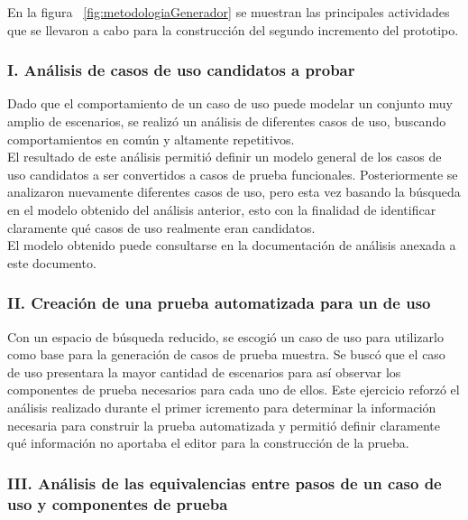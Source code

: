 	En la figura ~\ref{fig:metodologiaGenerador} se muestran las principales actividades que se llevaron a cabo para la construcción del segundo incremento del prototipo.
	
	
\subsubsection{I. Análisis de casos de uso candidatos a probar}

	Dado que el comportamiento de un caso de uso puede modelar un conjunto muy amplio de escenarios, se realizó un análisis de diferentes casos de uso, buscando comportamientos en común y altamente repetitivos.\\
	
	El resultado de este análisis permitió definir un modelo general de los casos de uso candidatos a ser convertidos a casos de prueba funcionales. Posteriormente se analizaron nuevamente diferentes casos de uso, pero esta vez basando la búsqueda en el modelo obtenido del análisis anterior, esto con la finalidad de identificar claramente qué casos de uso realmente eran candidatos.\\ El modelo obtenido puede consultarse en la documentación de análisis anexada a este documento.
	
	
\subsubsection{II. Creación de una prueba automatizada para un de uso}

	Con un espacio de búsqueda reducido, se escogió un caso de uso para utilizarlo como base para la generación de casos de prueba muestra. Se buscó que el caso de uso presentara la mayor cantidad de escenarios para así observar los componentes de prueba necesarios para cada uno de ellos. Este ejercicio reforzó el análisis realizado durante el primer icremento para determinar la información necesaria para construir la prueba automatizada y permitió definir claramente qué información no aportaba el editor para la construcción de la prueba.
	
\subsubsection{III. Análisis de las equivalencias entre pasos de un caso de uso y componentes de  prueba}

